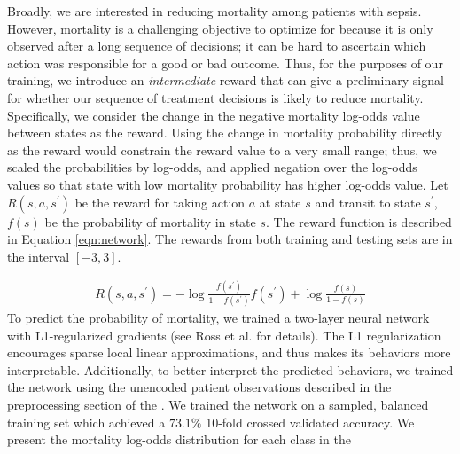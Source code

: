 \documentclass[10pt]{amia}
\begin{document}
Broadly, we are interested in reducing mortality among patients with sepsis.  However, mortality is a challenging objective to optimize for because it is only observed after a long sequence of decisions; it can be hard to ascertain which action was responsible for a good or bad outcome.  Thus, for the purposes of our training, we introduce an \emph{intermediate} reward that can give a preliminary signal for whether our sequence of treatment decisions is likely to reduce mortality.  Specifically, we consider the change in the negative mortality log-odds value between states as the reward.  Using the change in mortality probability directly as the reward would constrain the reward value to a very small range; thus, we scaled the probabilities by log-odds, and applied negation over the log-odds values so that state with low mortality probability has higher log-odds value. Let $R(s,a,s^\prime)$ be the reward for taking action $a$ at state $s$ and transit to state $s^\prime$, $f(s)$ be the probability of mortality in state $s$. The reward function is described in Equation \ref{eqn:network}. The rewards from both training and testing sets are in the interval $[-3, 3]$.

\begin{align}
\label{eqn:network}
R(s,a,s^\prime) = - \log \frac{f(s^\prime)}{1-f(s^\prime)} f(s^\prime) + \log \frac{f(s)}{1-f(s)}
\end{align}
To predict the probability of mortality, we trained a two-layer neural network with L1-regularized gradients (see Ross et al. \cite{nips2017timl} for details).  The L1 regularization encourages sparse local linear approximations, and thus makes its behaviors more interpretable. Additionally, to better interpret the predicted behaviors, we trained the network using the unencoded patient observations described in the preprocessing section of the . %
We trained the network on a sampled, balanced training set which achieved a $73.1\%$ 10-fold crossed validated accuracy. We present the mortality log-odds distribution for each class in the  %

\end{document}
